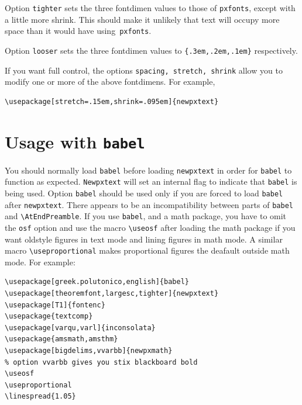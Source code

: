 \documentclass[11pt]{article}
\theoremstyle{oldplain}
\theoremstyle{plain}
\begin{document}
Option {\tt tighter} sets the three fontdimen values to those of {\tt pxfonts}, except with a little more shrink. This should make it unlikely that text will occupy more space than it would have using~{\tt pxfonts}. 

Option {\tt looser} sets the three fontdimen values to \verb|{.3em,.2em,.1em}| respectively. 

If you want full control, the options {\tt spacing, stretch, shrink} allow you to modify one or more of the above fontdimens. For example,
\begin{verbatim}
\usepackage[stretch=.15em,shrink=.095em]{newpxtext}
\end{verbatim}



\section{Usage with {\tt babel}}
You should normally load {\tt babel} before loading {\tt newpxtext} in order for {\tt babel} to function as expected. {\tt Newpxtext} will set an internal flag to indicate that {\tt babel} is being used. Option \texttt{babel} should be used only if you are forced to load {\tt babel} after {\tt newpxtext}. There appears  to be  an incompatibility between parts of {\tt babel} and \verb|\AtEndPreamble|. If you use {\tt babel}, and a math package, you have to omit the {\tt osf} option and use the macro \verb|\useosf| after loading the math package if you want oldstyle figures in text mode and lining figures in math mode. A similar macro \verb|\useproportional| makes proportional figures the deafault outside math mode. For example:
\begin{verbatim}
\usepackage[greek.polutonico,english]{babel}
\usepackage[theoremfont,largesc,tighter]{newpxtext}
\usepackage[T1]{fontenc}
\usepackage{textcomp}
\usepackage[varqu,varl]{inconsolata}
\usepackage{amsmath,amsthm}
\usepackage[bigdelims,vvarbb]{newpxmath}
% option vvarbb gives you stix blackboard bold
\useosf
\useproportional 
\linespread{1.05}
\end{verbatim}
\end{document}
